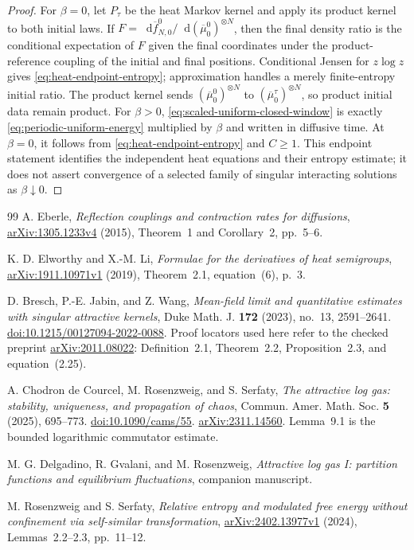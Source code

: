 \documentclass[11pt,reqno]{amsart}
\numberwithin{equation}{section}
\theoremstyle{definition}
\theoremstyle{remark}
\newcommand{\dd}{\mathop{}\!\mathrm d}
\newcommand{\revision}[1]{{\ifdefined\MarkedRevision\color{red}\fi#1}}
\begin{document}
\begin{proof}
For $\beta=0$, let $P_\tau$ be the heat Markov kernel and apply its product kernel to both initial laws. If $F=\dd\overline f_{N,0}^0/\dd(\overline\mu_0^0)^{\otimes N}$, then the final density ratio is the conditional expectation of $F$ given the final coordinates under the product-reference coupling of the initial and final positions. Conditional Jensen for $z\log z$ gives \eqref{eq:heat-endpoint-entropy}; approximation handles a merely finite-entropy initial ratio. The product kernel sends $(\overline\mu_0^0)^{\otimes N}$ to $(\overline\mu_0^\tau)^{\otimes N}$, so product initial data remain product. For $\beta>0$, \eqref{eq:scaled-uniform-closed-window} is exactly \eqref{eq:periodic-uniform-energy} multiplied by $\beta$ and written in diffusive time. At $\beta=0$, it follows from \eqref{eq:heat-endpoint-entropy} and $C\geq1$. This endpoint statement identifies the independent heat equations and their entropy estimate; it does not assert convergence of a selected family of singular interacting solutions as $\beta\downarrow0$.
\end{proof}

\begin{thebibliography}{99}
A. Eberle,
\emph{Reflection couplings and contraction rates for diffusions},
\href{https://arxiv.org/abs/1305.1233}{arXiv:1305.1233v4} (2015),
Theorem~1 and Corollary~2, pp.~5--6.

K. D. Elworthy and X.-M. Li,
\emph{Formulae for the derivatives of heat semigroups},
\href{https://arxiv.org/abs/1911.10971}{arXiv:1911.10971v1} (2019),
Theorem~2.1, equation~(6), p.~3.

D. Bresch, P.-E. Jabin, and Z. Wang,
\emph{Mean-field limit and quantitative estimates with singular attractive kernels},
Duke Math. J. \textbf{172} (2023), no.~13, 2591--2641.
\href{https://doi.org/10.1215/00127094-2022-0088}{doi:10.1215/00127094-2022-0088}.
Proof locators used here refer to the checked preprint
\href{https://arxiv.org/abs/2011.08022}{arXiv:2011.08022}: Definition~2.1, Theorem~2.2, Proposition~2.3, and equation~(2.25).

A. Chodron de Courcel, M. Rosenzweig, and S. Serfaty,
\emph{The attractive log gas: stability, uniqueness, and propagation of chaos},
Commun. Amer. Math. Soc. \textbf{5} (2025), 695--773.
\href{https://doi.org/10.1090/cams/55}{doi:10.1090/cams/55}.
\href{https://arxiv.org/abs/2311.14560}{arXiv:2311.14560}.
Lemma~9.1 is the bounded logarithmic commutator estimate.

M. G. Delgadino, R. Gvalani, and M. Rosenzweig,
\emph{Attractive log gas I: partition functions and equilibrium fluctuations},
companion manuscript.


\revision{M. Rosenzweig and S. Serfaty,
\emph{Relative entropy and modulated free energy without confinement via self-similar transformation},
\href{https://arxiv.org/abs/2402.13977}{arXiv:2402.13977v1} (2024), Lemmas~2.2--2.3, pp.~11--12.}

\end{thebibliography}
\end{document}
